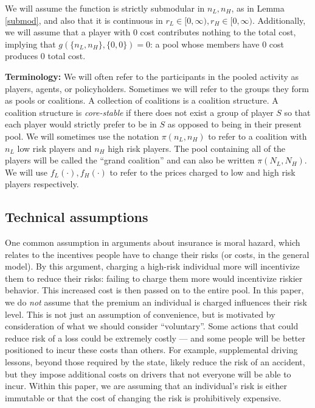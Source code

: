\documentclass[sigconf]{acmart}
\newcommand{\NL}[0]{\ensuremath{N_L}}
\newcommand{\NH}[0]{\ensuremath{N_H}}
\newcommand{\nL}[0]{\ensuremath{n_L}}
\newcommand{\nH}[0]{\ensuremath{n_H}}
\newcommand{\rL}[0]{\ensuremath{r_L}}
\newcommand{\rH}[0]{\ensuremath{r_H}}
\newcommand{\cost}[0]{\ensuremath{g}}
\newcommand{\priceL}[0]{\ensuremath{f_L}}
\newcommand{\priceH}[0]{\ensuremath{f_H}}
\newcommand{\cd}[0]{\cdot}
\begin{document}
We will assume the function is strictly submodular in $\nL, \nH$, as in Lemma \ref{submod}, and also that it is continuous in $\rL \in [0, \infty), \rH \in [0, \infty)$. Additionally, we will assume that a player with 0 cost contributes nothing to the total cost, implying that  $\cost(\{\nL, \nH\}, \{0, 0\}) = 0$: a pool whose members have 0 cost produces 0 total cost. 


\noindent \textbf{Terminology:} We will often refer to the participants in the pooled activity as players, agents, or policyholders. Sometimes we will refer to the groups they form as pools or coalitions. A collection of coalitions is a coalition structure. A coalition structure is \emph{core-stable} if there does not exist a group of player $S$ so that each player would strictly prefer to be in $S$ as opposed to being in their present pool. We will sometimes use the notation $\pi(\nL, \nH)$ to refer to a coalition with $\nL$ low risk players and $\nH$ high risk players. The pool containing all of the players will be called the \enquote{grand coalition} and can also be written $\pi(\NL, \NH)$. We will use $\priceL(\cd), \priceH(\cd)$ to refer to the prices charged to low and high risk players respectively. 

\subsection{Technical assumptions}

One common assumption in arguments about insurance is moral hazard, which relates to the incentives people have to change their risks (or costs, in the general model). By this argument, charging a high-risk individual more will incentivize them to reduce their risks: failing to charge them more would incentivize riskier behavior. This increased cost is then passed on to the entire pool. In this paper, we do \emph{not} assume that the premium an individual is charged influences their risk level. This is not just an assumption of convenience, but is motivated by consideration of what we should consider \enquote{voluntary}. Some actions that could reduce risk of a loss could be extremely costly --- and some people will be better positioned to incur these costs than others. For example, supplemental driving lessons, beyond those required by the state, likely reduce the risk of an accident, but they impose additional costs on drivers that not everyone will be able to incur. Within this paper, we are assuming that an individual's risk is either immutable or that the cost of changing the risk is prohibitively expensive.
\end{document}
